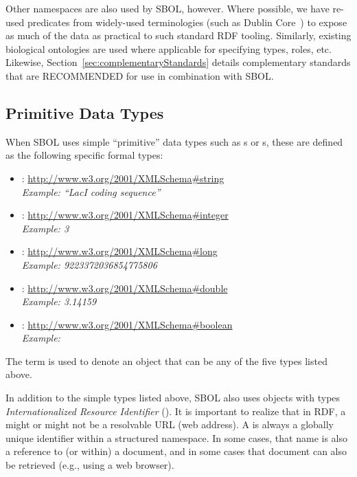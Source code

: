 Other namespaces are also used by SBOL, however.
Where possible, we have re-used predicates from widely-used terminologies (such as Dublin Core~\cite{dcmi2012}) to expose as much of the data as practical to such standard RDF tooling.
Similarly, existing biological ontologies are used where applicable for specifying types, roles, etc.
Likewise, Section~\ref{sec:complementaryStandards} details complementary standards that are RECOMMENDED for use in combination with SBOL.


\subsection{Primitive Data Types}
\label{sec:datatypes}
\label{sec:String}
\label{sec:Integer}
\label{sec:Long}
\label{sec:Double}
\label{sec:Boolean}
\label{sec:IRI}
\label{sec:URL}
\label{sec:literal}

When SBOL uses simple ``primitive'' data types such as s or s, these are defined as the following specific formal types:
  \begin{itemize}
\item {}: \href{http://www.w3.org/2001/XMLSchema}{http://www.w3.org/2001/XMLSchema\#string}\\
  {\em Example: ``LacI coding sequence''}
\item {}: \href{http://www.w3.org/2001/XMLSchema}{http://www.w3.org/2001/XMLSchema\#integer}\\
  {\em Example: 3}
\item {}: \href{http://www.w3.org/2001/XMLSchema}{http://www.w3.org/2001/XMLSchema\#long}\\
  {\em Example: 9223372036854775806}
\item {}: \href{http://www.w3.org/2001/XMLSchema}{http://www.w3.org/2001/XMLSchema\#double}\\
  {\em Example: 3.14159}
\item {}: \href{http://www.w3.org/2001/XMLSchema}{http://www.w3.org/2001/XMLSchema\#boolean}\\
  {\em Example: }
\end{itemize}
The term  is used to denote an object that can be any of the five types listed above.

In addition to the simple types listed above, SBOL also uses objects with types \emph{Internationalized Resource Identifier} (). 
It is important to realize that in RDF, a  might or might not be a resolvable URL (web address).  
A  is always a globally unique identifier within a structured namespace.  In some cases, that name is also a reference to (or within) a document, and in some cases that document can also be retrieved (e.g., using a web browser).


